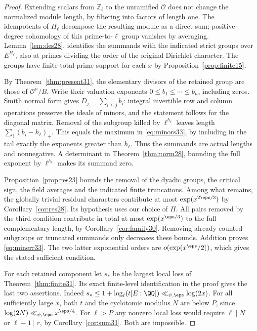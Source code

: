 \documentclass[a4paper,11pt]{article}
\theoremstyle{definition}
\theoremstyle{remark}
\newcommand{\ZZ}{\mathbb Z}\newcommand{\ord}{\operatorname{ord}}
\numberwithin{equation}{section}
\begin{document}
\begin{proof}
Extending scalars from \(\ZZ_\ell\) to the unramified \(\mathcal O\) does not change the normalized module length, by filtering into factors of length one. The idempotents of \(H_\ell\) decompose the resulting module as a direct sum; positive-degree cohomology of this prime-to-\(\ell\) group vanishes by averaging. Lemma~\ref{lem:des28}, identifies the summands with the indicated strict groups over \(E^{H_\ell}\), also at primes dividing the order of the original Dirichlet character. The groups have finite total prime support for each \(x\) by Proposition~\ref{prop:finite15}.

By Theorem~\ref{thm:present31}, the elementary divisors of the retained group are those of \(\mathcal O^n/B\). Write their valuation exponents \(0\le b_1\le\cdots\le b_n\), including zeros. Smith normal form gives \(D_j=\sum_{i\le j}b_i\): integral invertible row and column operations preserve the ideals of minors, and the statement follows for the diagonal matrix. Removal of the subgroup killed by \(\ell^{h_\ell}\) leaves length \(\sum_i(b_i-h_\ell)_+\). This equals the maximum in \eqref{eq:minors33}, by including in the tail exactly the exponents greater than \(h_\ell\). Thus the summands are actual lengths and nonnegative. A determinant in Theorem~\ref{thm:norm28}, bounding the full exponent by \(\ell^{h_\ell}\) makes its summand zero.

Proposition~\ref{prop:res23} bounds the removal of the dyadic groups, the critical sign, the field averages and the indicated finite truncations. Among what remains, the globally trivial residual characters contribute at most \(\exp(x^{2\eps/3})\) by Corollary~\ref{cor:res28}. Its hypothesis uses our choice of \(\Pi\). All pairs removed by the third condition contribute in total at most \(\exp(x^{\eps/3})\) to the full complementary length, by Corollary~\ref{cor:family30}. Removing already-counted subgroups or truncated summands only decreases these bounds. Addition proves \eqref{eq:minerr33}. The two latter exponential orders are \(o(\exp(x^\eps/2))\), which gives the stated sufficient condition.

For each retained component let \(s_*\) be the largest local loss of Theorem~\ref{thm:finite31}. Its exact finite-level identification in the proof gives the last two assertions. Indeed \(s_*\le 1+\log_\ell(t[E:\QQ])\ll_{\psi,\eps}\log(2x)\). For all sufficiently large \(x\), both \(t\) and the cyclotomic modulus \(N\) are below \(P\), since \(\log(2N)\ll_{\psi,\eps}x^{\eps/4}\). For \(\ell>P\) any nonzero local loss would require \(\ell\mid N\) or \(\ell-1\mid r\), by Corollary~\ref{cor:sum31}. Both are impossible.
\end{proof}
\end{document}
